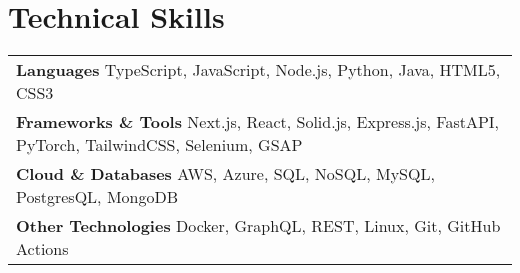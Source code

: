 \documentclass[a4paper,11pt]{article}
\makeatletter
\newcommand{\resumeItem}[1]{
  \item\small{
    {#1 \vspace{-2pt}}
  }
}
\newcommand{\resumeSubheading}[4]{
  \vspace{-2pt}\item
    \begin{tabular*}{1.0\textwidth}[t]{l@{\extracolsep{\fill}}r}
      \textbf{#1} & \textbf{\small #2} \\
      \textit{\small#3} & \textit{\small #4} \\
    \end{tabular*}\vspace{-7pt}
}
\newcommand{\resumeSubHeadingListStart}{\begin{itemize}[leftmargin=0.0in, label={}]}
\newcommand{\resumeSubHeadingListEnd}{\end{itemize}}
\newcommand{\resumeItemListStart}{\begin{itemize}}
\newcommand{\resumeItemListEnd}{\end{itemize}\vspace{-5pt}}
\makeatother
\begin{document}
\section{Technical Skills}
\begin{tabular*}{1.0\textwidth}{l}
  \textbf{Languages} TypeScript, JavaScript, Node.js, Python, Java, HTML5, CSS3 \\
  \textbf{Frameworks \& Tools} Next.js, React, Solid.js, Express.js, FastAPI, PyTorch, TailwindCSS, Selenium, GSAP \\
  \textbf{Cloud \& Databases} AWS, Azure, SQL, NoSQL, MySQL, PostgresQL, MongoDB \\
  \textbf{Other Technologies} Docker, GraphQL, REST, Linux, Git, GitHub Actions
\end{tabular*}
\vspace{-13pt}




\end{document}
